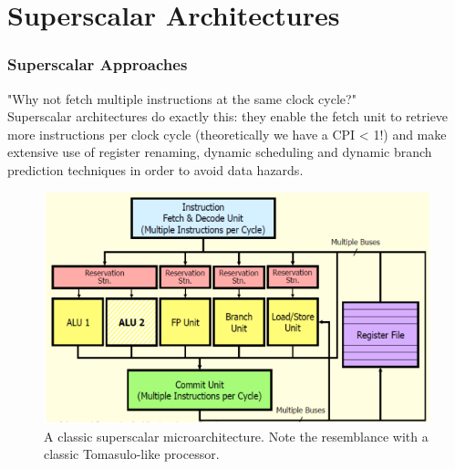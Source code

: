 \documentclass[10pt,a4paper]{article}
\begin{document}
	\clearpage \part{Superscalar Architectures}	
		\section{Superscalar Approaches}
			"Why not fetch multiple instructions at the same clock cycle?"\\
			Superscalar architectures do exactly this: they enable the fetch unit to retrieve more instructions per clock cycle (theoretically we have a CPI < 1!) and make extensive use of register renaming, dynamic scheduling and dynamic branch prediction techniques in order to avoid data hazards.
			\begin{figure}[H]
				\centering
				\includegraphics[width = \textwidth]{./images/superscalar.png}
				\caption{A classic superscalar microarchitecture. Note the resemblance with a classic Tomasulo-like processor.}
			\end{figure}
			
\end{document}
